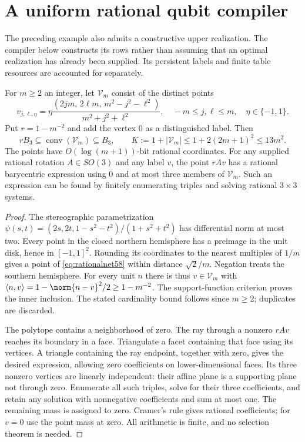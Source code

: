 \section{A uniform rational qubit compiler}\label{sec:rationalcompiler58}
The preceding example also admits a constructive upper realization. The
compiler below constructs its rows rather than assuming that an optimal
realization has already been supplied. Its persistent labels and finite
table resources are accounted for separately.

\begin{lemma}\label{lem:rationalnet58}
For $m\ge2$ an integer, let $\mathcal V_m$ consist of the distinct points
\begin{equation}\label{eq:rationalnet58}
 v_{j,\ell,\eta}
 =\eta\frac{(2jm,\,2\ell m,\,m^2-j^2-\ell^2)}{m^2+j^2+\ell^2},
 \quad -m\le j,\ell\le m,\quad \eta\in\{-1,1\}.
\end{equation}
Put $r=1-m^{-2}$ and add the vertex $0$ as a distinguished label. Then
\[
 rB_3\subseteq\operatorname{conv}(\mathcal V_m)\subseteq B_3,
 \qquad K:=1+|\mathcal V_m|\le1+2(2m+1)^2\le13m^2.
\]
The points have $O(\log(m+1))$-bit rational coordinates. For any supplied
rational rotation $A\in SO(3)$ and any label $v$, the point $rAv$ has a
rational barycentric expression using $0$ and at most three members of
$\mathcal V_m$. Such an expression can be found by finitely enumerating
triples and solving rational $3\times3$ systems.
\end{lemma}
\begin{proof}
The stereographic parametrization
$\psi(s,t)=(2s,2t,1-s^2-t^2)/(1+s^2+t^2)$ has differential norm at
most two. Every point in the closed northern hemisphere has a preimage
in the unit disk, hence in $[-1,1]^2$. Rounding its coordinates to the
nearest multiples of $1/m$ gives a point of \eqref{eq:rationalnet58}
within distance $\sqrt2/m$. Negation treats the southern hemisphere.
For every unit $n$ there is thus $v\in\mathcal V_m$ with
$\langle n,v\rangle=1-\norm{n-v}^2/2\ge1-m^{-2}$.
The support-function criterion proves the inner inclusion. The stated
cardinality bound follows since $m\ge2$; duplicates are discarded.

The polytope contains a neighborhood of zero. The ray through a nonzero
$rAv$ reaches its boundary in a face. Triangulate a facet containing
that face using its vertices. A triangle containing the ray endpoint,
together with zero, gives the desired expression, allowing zero
coefficients on lower-dimensional faces. Its three nonzero vertices
are linearly independent: their affine plane is a supporting plane not
through zero. Enumerate all such triples, solve for their three
coefficients, and retain any solution with nonnegative coefficients and
sum at most one. The remaining mass is assigned to zero. Cramer's rule
gives rational coefficients; for $v=0$ use the point mass at zero.
All arithmetic is finite, and no selection theorem is needed.
\end{proof}

